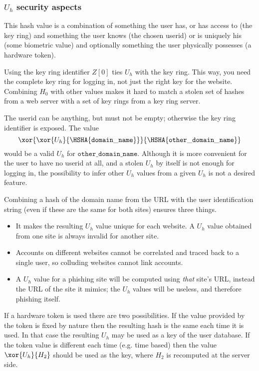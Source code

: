 \subsubsection{$U_h$ security aspects}
This hash value is a combination of something the user has,
or has access to
(the key ring)
and something the user knows
(the chosen userid)
or is uniquely his
(some biometric value)
and optionally something the user physically possesses
(a hardware token).
\par
Using the key ring identifier $Z[0]$ ties $U_h$ with the key ring.
This way, you need the complete key ring for logging in, not just the right key for the website.
Combining $H_0$ with other values makes it hard to match a stolen set of hashes from a web server
with a set of key rings from a key ring server.
\par
The userid can be anything, but must not be empty; otherwise the key ring identifier is exposed.
The value
\[\xor{\xor{U_h}{\HSHA{\mathtt{domain\_name}}}}{\HSHA{\mathtt{other\_domain\_name}}}\]
would be a valid $U_h$ for ${\mathtt{other\_domain\_name}}$.
Although it is more convenient for the user to have no userid at all,
and a stolen $U_h$ by itself is not enough for logging in,
the possibility to infer other $U_h$ values from a given $U_h$ is not a desired feature.
\par
Combining a hash of the domain name from the URL with the user identification string
(even if these are the same for both sites)
ensures three things.
\begin{itemize}
\item It makes the resulting $U_h$ value unique for each website.
A $U_h$ value obtained from one site is always invalid for another site.
\item Accounts on different websites cannot be correlated and traced back to a single user,
so colluding websites cannot link accounts.
\item A $U_h$ value for a phishing site will be computed using \emph{that} site's URL,
instead the URL of the site it mimics;
the $U_h$ values will be useless,
and therefore phishing itself.
\end{itemize}
\par
If a hardware token is used there are two possibilities.
If the value provided by the token is fixed by nature then the resulting hash is the same each time it is used.
In that case the resulting $U_h$ may be used as a key of the user database.
If the token value is different each time
(e.g. time based)
then the value $\xor{U_h}{H_2}$ should be used as the key,
where $H_2$ is recomputed at the server side.

